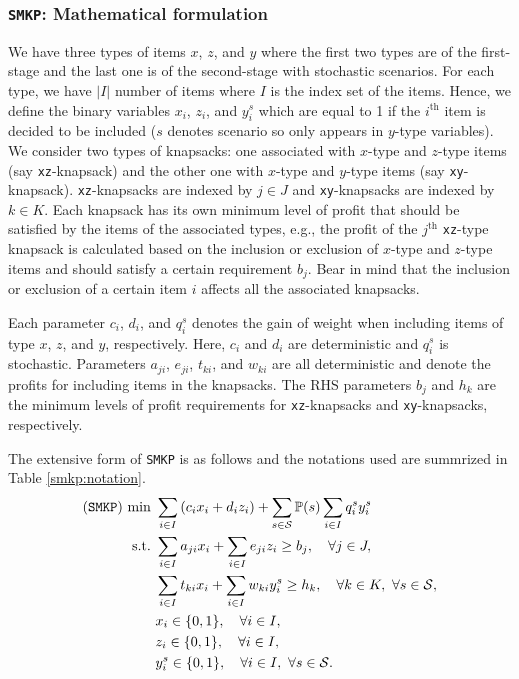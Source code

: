 \subsubsection{\texttt{SMKP}: Mathematical formulation}
We have three types of items $x$, $z$, and $y$ where the first two types are of the first-stage and the last one is of the second-stage with stochastic scenarios. For each type, we have $|I|$ number of items where $I$ is the index set of the items. Hence, we define the binary variables $x_i$, $z_i$, and $y_i^s$ which are equal to 1 if the $i^{\mathrm{th}}$ item is decided to be included ($s$ denotes scenario so only appears in $y$-type variables). We consider two types of knapsacks: one associated with $x$-type and $z$-type items (say \texttt{xz}-knapsack) and the other one with $x$-type and $y$-type items (say \texttt{xy}-knapsack). \texttt{xz}-knapsacks are indexed by $j\in J$ and \texttt{xy}-knapsacks are indexed by $k\in K$.  Each knapsack has its own minimum level of profit that should be satisfied by the items of the associated types, e.g., the profit of the $j^{\mathrm{th}}$ \texttt{xz}-type knapsack is calculated based on the inclusion or exclusion of $x$-type and $z$-type items and should satisfy a certain requirement $b_j$. Bear in mind that the inclusion or exclusion of a certain item $i$ affects all the associated knapsacks.
 
Each parameter $c_i$, $d_i$, and $q_i^s$ denotes the gain of weight when including items of type $x$, $z$, and $y$, respectively. Here, $c_i$ and $d_i$ are deterministic and $q_i^s$ is stochastic. Parameters $a_{ji}$, $e_{ji}$, $t_{ki}$, and $w_{ki}$ are all deterministic and denote the profits for including items in the knapsacks. The RHS parameters $b_j$ and $h_k$ are the minimum levels of profit requirements for \texttt{xz}-knapsacks and \texttt{xy}-knapsacks, respectively.

The extensive form of \texttt{SMKP} is as follows and the notations used are summrized in Table \ref{smkp:notation}.
\begin{subequations} \label{smkp:formulation}
	\begin{align}
	(\texttt{SMKP})\ \textrm{min}\ &\sum_{i \in I}\left(c_i x_i + d_i z_i\right) + \sum_{s\in\mathcal{S}}\operatorname*{\mathbb{P}}(s)\sum_{i\in I}q_i^s y_i^s \label{smkp:obj}\\
	\textrm{s.t.}\ &  \sum_{i\in I}a_{ji}x_{i} + \sum_{i \in I}e_{ji}z_i\ge b_j,\quad\forall j\in J, \label{smkp:b}\\
	&  \sum_{i\in I} t_{ki}x_i + \sum_{i\in I}w_{ki} y_i^s\ge h_k,\quad\forall k\in K,\ \forall s\in\mathcal{S}, \label{smkp:c}\\
	&  x_i\in\{0,1\},\quad\forall i\in I, \label{smkp:d}\\
	&  z_i\in\{0,1\},\quad\forall i\in I, \label{smkp:e}\\
	&  y_i^s\in\{0,1\},\quad\forall i\in I,\ \forall s\in \mathcal{S}. \label{smkp:f}
	\end{align}
\end{subequations}

